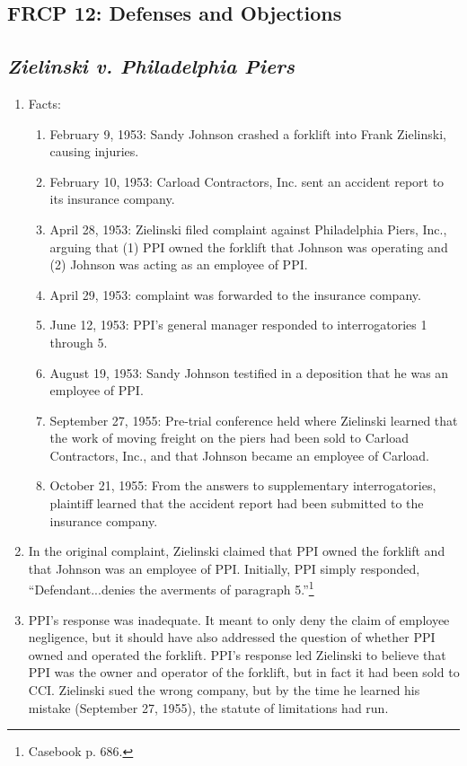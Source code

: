 \subsection{FRCP 12: Defenses and Objections}

\subsection{\emph{Zielinski v. Philadelphia Piers}}

\begin{enumerate}
    \item Facts:
    \begin{enumerate}
        \item February 9, 1953: Sandy Johnson crashed a forklift into Frank Zielinski, causing injuries.
        \item February 10, 1953: Carload Contractors, Inc. sent an accident report to its insurance company.
        \item April 28, 1953: Zielinski filed complaint against Philadelphia Piers, Inc., arguing that (1) PPI owned the forklift that Johnson was operating and (2) Johnson was acting as an employee of PPI.
        \item April 29, 1953: complaint was forwarded to the insurance company.
        \item June 12, 1953: PPI's general manager responded to interrogatories 1 through 5.
        \item August 19, 1953: Sandy Johnson testified in a deposition that he was an employee of PPI.
        \item September 27, 1955: Pre-trial conference held where Zielinski learned that the work of moving freight on the piers had been sold to Carload Contractors, Inc., and that Johnson became an employee of Carload.
        \item October 21, 1955: From the answers to supplementary interrogatories, plaintiff learned that the accident report had been submitted to the insurance company.
    \end{enumerate}
    \item In the original complaint, Zielinski claimed that PPI owned the forklift and that Johnson was an employee of PPI. Initially, PPI simply responded, ``Defendant...denies the averments of paragraph 5.''\footnote{Casebook p. 686.}
    \item PPI's response was inadequate. It meant to only deny the claim of employee negligence, but it should have also addressed the question of whether PPI owned and operated the forklift. PPI's response led Zielinski to believe that PPI was the owner and operator of the forklift, but in fact it had been sold to CCI. Zielinski sued the wrong company, but by the time he learned his mistake (September 27, 1955), the statute of limitations had run.

\end{enumerate}
